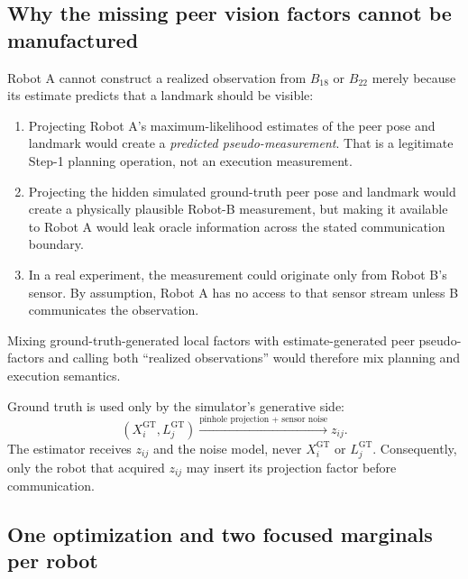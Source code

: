 \documentclass[11pt,a4paper]{article}
\begin{document}
\subsection{Why the missing peer vision factors cannot be manufactured}

Robot A cannot construct a realized observation from $B_{18}$ or $B_{22}$
merely because its estimate predicts that a landmark should be visible:
\begin{enumerate}
  \item Projecting Robot A's maximum-likelihood estimates of the peer pose and
        landmark would create a \emph{predicted pseudo-measurement}.  That is a
        legitimate Step-1 planning operation, not an execution measurement.
  \item Projecting the hidden simulated ground-truth peer pose and landmark
        would create a physically plausible Robot-B measurement, but making it
        available to Robot A would leak oracle information across the stated
        communication boundary.
  \item In a real experiment, the measurement could originate only from Robot
        B's sensor.  By assumption, Robot A has no access to that sensor stream
        unless B communicates the observation.
\end{enumerate}
Mixing ground-truth-generated local factors with estimate-generated peer
pseudo-factors and calling both ``realized observations'' would therefore mix
planning and execution semantics.

Ground truth is used only by the simulator's generative side:
\[
 (X_i^{\mathrm{GT}},L_j^{\mathrm{GT}})
 \xrightarrow{\text{pinhole projection + sensor noise}} z_{ij}.
\]
The estimator receives $z_{ij}$ and the noise model, never
$X_i^{\mathrm{GT}}$ or $L_j^{\mathrm{GT}}$.  Consequently, only the robot that
acquired $z_{ij}$ may insert its projection factor before communication.

\subsection{One optimization and two focused marginals per robot}
\end{document}
